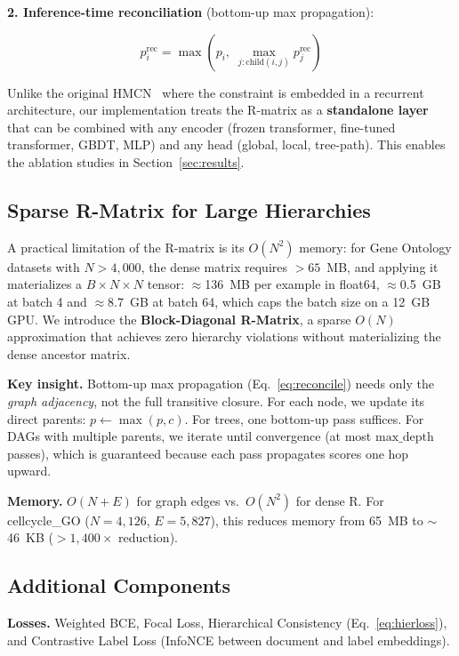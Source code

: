 \documentclass[11pt,a4paper]{article}
\begin{document}
\textbf{2. Inference-time reconciliation} (bottom-up max propagation):

\begin{equation}
p_i^{\text{rec}} = \max\left(p_i,\; \max_{j: \text{child}(i,j)} p_j^{\text{rec}}\right)
\label{eq:reconcile}
\end{equation}

Unlike the original HMCN~\cite{giunchiglia2018hmc} where the
constraint is embedded in a recurrent architecture, our implementation
treats the R-matrix as a \textbf{standalone layer} that can be
combined with any encoder (frozen transformer, fine-tuned transformer,
GBDT, MLP) and any head (global, local, tree-path). This enables the
ablation studies in Section~\ref{sec:results}.

\subsection{Sparse R-Matrix for Large Hierarchies}
\label{sec:sparse}

A practical limitation of the R-matrix is its $O(N^2)$ memory:
for Gene Ontology datasets with $N > 4{,}000$, the dense matrix
requires $>65$~MB, and applying it materializes a
$B \times N \times N$ tensor: $\approx$136~MB per example in float64,
$\approx$0.5~GB at batch 4 and $\approx$8.7~GB at batch 64, which caps
the batch size on a 12~GB GPU.  We
introduce the \textbf{Block-Diagonal R-Matrix}, a sparse $O(N)$
approximation that achieves zero hierarchy violations without
materializing the dense ancestor matrix.

\textbf{Key insight.} Bottom-up max propagation
(Eq.~\ref{eq:reconcile}) needs only the \emph{graph adjacency}, not
the full transitive closure.  For each node, we update its direct
parents: $p \leftarrow \max(p, c)$.  For trees, one bottom-up pass
suffices.  For DAGs with multiple parents, we iterate until
convergence (at most $\text{max\_depth}$ passes), which is guaranteed
because each pass propagates scores one hop upward.

\textbf{Memory.} $O(N + E)$ for graph edges vs.\ $O(N^2)$ for dense
R.  For cellcycle\_GO ($N{=}4{,}126$, $E{=}5{,}827$), this reduces
memory from 65~MB to $\sim$46~KB ($>1{,}400\times$ reduction).

\subsection{Additional Components}

\textbf{Losses.} Weighted BCE, Focal Loss, Hierarchical Consistency
(Eq.~\ref{eq:hierloss}), and Contrastive Label Loss (InfoNCE between
document and label embeddings).
\end{document}
